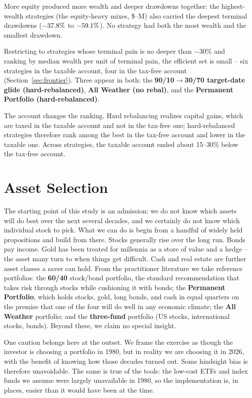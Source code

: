 \documentclass[11pt]{article}
\begin{document}
More equity produced more wealth and deeper drawdowns together: the highest-wealth strategies (the
equity-heavy mixes, \$\EquityHeavyLo--\EquityHeavyHi M) also carried the deepest terminal drawdowns ($-37.8\%$ to $-59.1\%$). No
strategy had both the most wealth and the smallest drawdown.

Restricting to strategies whose terminal pain is no deeper than $-30\%$ and ranking by median wealth
per unit of terminal pain, the efficient set is small -- six strategies in the taxable account, four in
the tax-free account (Section~\ref{sec:frontier}). Three appear in both: the
\textbf{90/10$\to$30/70 target-date glide (hard-rebalanced)}, \textbf{All Weather (no rebal)}, and the
\textbf{Permanent Portfolio (hard-rebalanced)}.

The account changes the ranking. Hard rebalancing realizes capital gains, which are taxed in the
taxable account and not in the tax-free one; hard-rebalanced strategies therefore rank among the best
in the tax-free account and lower in the taxable one. Across strategies, the taxable account ended
about 15--30\% below the tax-free account.

\section{Asset Selection}\label{sec:assetselection}

The starting point of this study is an admission: we do not know which assets will do best over the
next several decades, and we certainly do not know which individual stock to pick. What we can do is
begin from a handful of widely held propositions and build from there. Stocks generally rise over the
long run. Bonds pay income. Gold has been treated for millennia as a store of value and a hedge -- the
asset many turn to when things get difficult. Cash and real estate are further asset classes a saver
can hold. From the practitioner literature we take reference portfolios: the \textbf{60/40} stock/bond
portfolio, the standard recommendation that takes risk through stocks while cushioning it with bonds;
the \textbf{Permanent Portfolio}, which holds stocks, gold, long bonds, and cash in equal quarters on
the premise that one of the four will do well in any economic climate; the \textbf{All Weather}
portfolio; and the \textbf{three-fund} portfolio (US stocks, international stocks, bonds). Beyond these,
we claim no special insight.

One caution belongs here at the outset. We frame the exercise as though the investor is choosing a
portfolio in 1980, but in reality we are choosing it in 2026, with the benefit of knowing how those
decades turned out. Some hindsight bias is therefore unavoidable. The same is true of the tools: the
low-cost ETFs and index funds we assume were largely unavailable in 1980, so the implementation is, in
places, easier than it would have been at the time.
\end{document}
